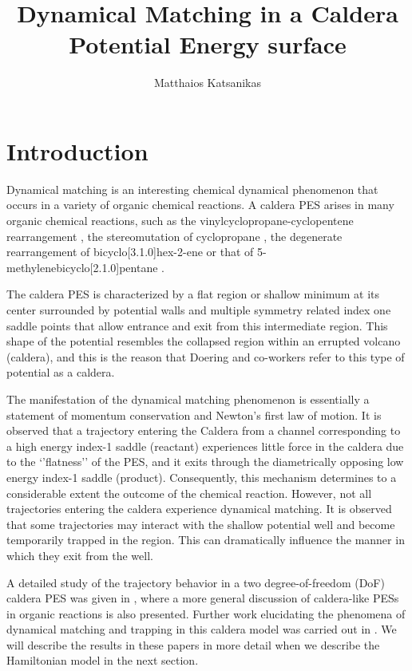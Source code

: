 \documentclass[a4paper,10pt]{article}
\title{Dynamical Matching in a Caldera Potential Energy surface}
\author{Matthaios Katsanikas}
\date{}
\begin{document}
                           
\maketitle






\section{Introduction}
%
Dynamical matching is an interesting chemical dynamical phenomenon that occurs in a variety of  organic chemical reactions. A caldera PES  arises  in many organic chemical reactions, such as the  vinylcyclopropane-cyclopentene rearrangement \cite{baldwin2003,gold1988}, the stereomutation of cyclopropane \cite{doubleday1997}, the degenerate rearrangement of bicyclo[3.1.0]hex-2-ene \cite{doubleday1999,doubleday2006} or that of 5-methylenebicyclo[2.1.0]pentane \cite{reyes2002}.
 
The caldera PES is characterized by a flat region or shallow minimum at its center  surrounded by potential walls and multiple symmetry related index one saddle points that allow entrance and exit from this intermediate region. This shape of the potential resembles  the collapsed  region within an errupted  volcano (caldera), and this is the reason that Doering \cite{doering2002} and co-workers  refer to this type of  potential  as a caldera.

The manifestation of the dynamical matching phenomenon is essentially a statement of  momentum conservation and Newton’s first law of motion. It is observed that a trajectory entering the Caldera from a channel corresponding to a high energy index-1 saddle (reactant) experiences little force in the caldera due to the ‘’flatness’’ of the PES, and it exits through the diametrically opposing low energy index-1 saddle (product). Consequently, this mechanism determines to a considerable extent the outcome of the chemical reaction. However, not all trajectories entering the caldera experience dynamical matching. It is observed that some trajectories may interact with the shallow potential well and become temporarily trapped in the region. This can dramatically influence the manner in which they exit from the well. 

A detailed study of the trajectory behavior in a two degree-of-freedom (DoF) caldera PES was given in \cite{collins2014}, where a more general discussion of caldera-like PESs in organic reactions is also presented. Further work elucidating the phenomena of dynamical matching and trapping  in this caldera model was carried out in \cite{ katsanikas2018,katsanikas2019}. We will describe the results in these papers in more detail when we describe the Hamiltonian model in the next section.
\end{document}
